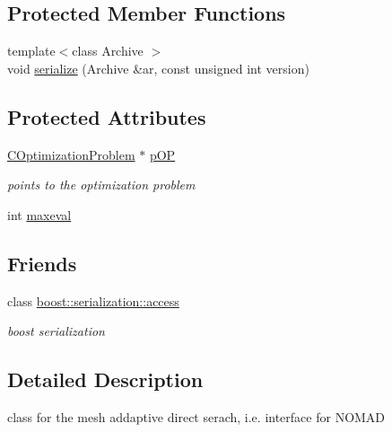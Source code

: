 \subsection*{Protected Member Functions}
\begin{DoxyCompactItemize}
\item 
{\footnotesize template$<$class Archive $>$ }\\void \hyperlink{class_go_s_u_m_1_1_c_m_a_d_s_a17c1bc35dc49c5955e80cb3bc3b88565}{serialize} (Archive \&ar, const unsigned int version)
\end{DoxyCompactItemize}
\subsection*{Protected Attributes}
\begin{DoxyCompactItemize}
\item 
\hyperlink{class_go_s_u_m_1_1_c_optimization_problem}{C\-Optimization\-Problem} $\ast$ \hyperlink{class_go_s_u_m_1_1_c_m_a_d_s_a181584f16f368a69f6bd2d71e2f88f3c}{p\-O\-P}
\begin{DoxyCompactList}\small\item\em points to the optimization problem \end{DoxyCompactList}\item 
int \hyperlink{class_go_s_u_m_1_1_c_m_a_d_s_a32b63abd38e4866c6d75ebb7d0f51195}{maxeval}
\end{DoxyCompactItemize}
\subsection*{Friends}
\begin{DoxyCompactItemize}
\item 
class \hyperlink{class_go_s_u_m_1_1_c_m_a_d_s_ac98d07dd8f7b70e16ccb9a01abf56b9c}{boost\-::serialization\-::access}
\begin{DoxyCompactList}\small\item\em boost serialization \end{DoxyCompactList}\end{DoxyCompactItemize}


\subsection{Detailed Description}
class for the mesh addaptive direct serach, i.\-e. interface for N\-O\-M\-A\-D 

